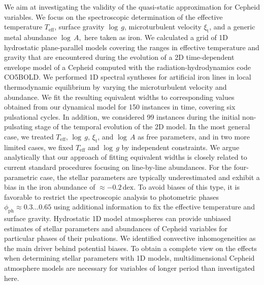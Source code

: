 \documentclass{aa}
\begin{document}
{We aim at investigating the validity of the quasi-static 
approximation for Cepheid variables. 
We focus on the spectroscopic   
determination of the effective temperature $T_\mathrm{eff}$, surface gravity $\log \,g$, 
microturbulent velocity $\xi_\mathrm{t}$, and a generic metal abundance $\log
\,A,$  here taken as iron.}
{We calculated a grid of 1D hydrostatic plane-parallel models covering the
  ranges in effective temperature and gravity that are encountered during the evolution
  of a 2D time-dependent envelope model of a Cepheid computed 
  with the radiation-hydrodynamics code CO5BOLD. We performed
  1D spectral syntheses for artificial iron lines
  in local thermodynamic equilibrium by varying the microturbulent velocity and
  abundance.  We fit the resulting equivalent widths to corresponding values
  obtained from our dynamical model for 150 instances in time, covering six
  pulsational cycles. In addition, we considered 99 instances during the
  initial non-pulsating stage of the temporal evolution of the 2D 
  model. 
  In the most
  general case, we treated $T_\mathrm{eff}$, $\log\,g$, $\xi_\mathrm{t}$, and
  $\log\,A$ as free parameters, and in two more limited cases, we
  fixed $T_\mathrm{eff}$ and $\log\,g$ by independent constraints.  We argue
  analytically that our approach of fitting equivalent widths is closely
  related to current standard procedures focusing on line-by-line abundances.}
{For the four-parametric case, the stellar parameters are
  typically underestimated and exhibit a bias in the iron abundance of
  $\approx-0.2\,\mbox{dex}$.  To avoid biases of this type, it is 
  favorable to restrict the spectroscopic analysis to photometric phases
  $\phi_\mathrm{ph}\approx0.3\ldots 0.65$ using additional information
  to fix the effective temperature and surface gravity.}
{Hydrostatic 1D model atmospheres can provide unbiased estimates
  of stellar parameters and abundances of Cepheid variables for particular
  phases of their pulsations. We identified convective inhomogeneities as the
  main driver behind potential biases. To obtain a complete view on
  the effects when determining stellar parameters with 1D models,
  multidimensional Cepheid atmosphere models are necessary for variables of longer
  period than investigated here.}

  \maketitle
\end{document}
